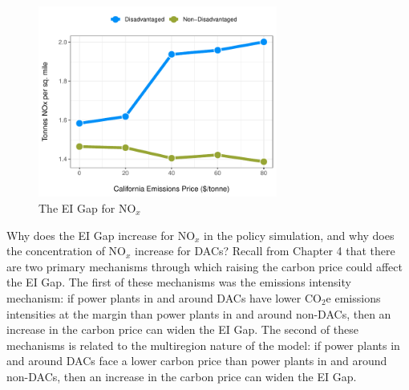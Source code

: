 \begin{figure}
    \centering
    \caption{The EI Gap for NO$_x$ \label{ei_gap_bca_nox}}
    \includegraphics[width=0.7\textwidth]{figures/chapter5_figures/ei_gap_bca_nox.pdf}
\end{figure}

Why does the EI Gap increase for NO$_x$ in the policy simulation, and why does the concentration of NO$_x$ increase for DACs? Recall from Chapter 4 that there are two primary mechanisms through which raising the carbon price could affect the EI Gap. The first of these mechanisms was the emissions intensity mechanism: if power plants in and around DACs have lower CO$_2$e emissions intensities at the margin than power plants in and around non-DACs, then an increase in the carbon price can widen the EI Gap. The second of these mechanisms is related to the multiregion nature of the model: if power plants in and around DACs face a lower carbon price than power plants in and around non-DACs, then an increase in the carbon price can widen the EI Gap. 

